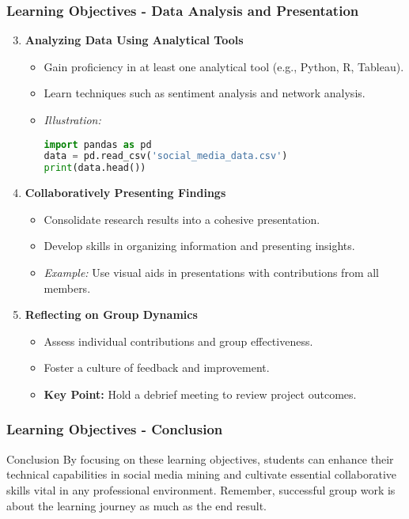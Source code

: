 \documentclass{beamer}
\begin{document}
\begin{frame}[fragile]
    \frametitle{Learning Objectives - Data Analysis and Presentation}
    \begin{enumerate}
        \setcounter{enumi}{2}
        \item \textbf{Analyzing Data Using Analytical Tools}
        \begin{itemize}
            \item Gain proficiency in at least one analytical tool (e.g., Python, R, Tableau).
            \item Learn techniques such as sentiment analysis and network analysis.
            \item \textit{Illustration:}
            \begin{lstlisting}[language=Python]
import pandas as pd
data = pd.read_csv('social_media_data.csv')
print(data.head())
            \end{lstlisting}
        \end{itemize}

        \item \textbf{Collaboratively Presenting Findings}
        \begin{itemize}
            \item Consolidate research results into a cohesive presentation.
            \item Develop skills in organizing information and presenting insights.
            \item \textit{Example:} Use visual aids in presentations with contributions from all members.
        \end{itemize}

        \item \textbf{Reflecting on Group Dynamics}
        \begin{itemize}
            \item Assess individual contributions and group effectiveness.
            \item Foster a culture of feedback and improvement.
            \item \textbf{Key Point:} Hold a debrief meeting to review project outcomes.
        \end{itemize}
    \end{enumerate}
\end{frame}

\begin{frame}[fragile]
    \frametitle{Learning Objectives - Conclusion}
    \begin{block}{Conclusion}
        By focusing on these learning objectives, students can enhance their technical capabilities in social media mining and cultivate essential collaborative skills vital in any professional environment. 
        Remember, successful group work is about the learning journey as much as the end result.
    \end{block}
\end{frame}
\end{document}

